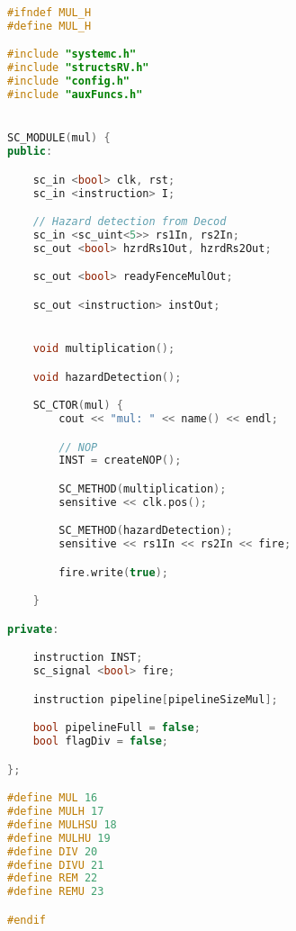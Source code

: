 \begin{lstlisting}[language=C++]
#ifndef MUL_H
#define MUL_H

#include "systemc.h"
#include "structsRV.h"
#include "config.h"
#include "auxFuncs.h"


SC_MODULE(mul) {
public:

	sc_in <bool> clk, rst;
	sc_in <instruction> I;

	// Hazard detection from Decod
	sc_in <sc_uint<5>> rs1In, rs2In;
	sc_out <bool> hzrdRs1Out, hzrdRs2Out;

	sc_out <bool> readyFenceMulOut;

	sc_out <instruction> instOut;


	void multiplication();

	void hazardDetection();

	SC_CTOR(mul) {
		cout << "mul: " << name() << endl;

		// NOP
		INST = createNOP();

		SC_METHOD(multiplication);
		sensitive << clk.pos();

		SC_METHOD(hazardDetection);
		sensitive << rs1In << rs2In << fire;

		fire.write(true);

	}

private:

	instruction INST;
	sc_signal <bool> fire;

	instruction pipeline[pipelineSizeMul];

	bool pipelineFull = false;
	bool flagDiv = false;

};

#define MUL 16
#define MULH 17
#define MULHSU 18
#define MULHU 19
#define DIV 20
#define DIVU 21
#define REM 22
#define REMU 23

#endif
\end{lstlisting}

